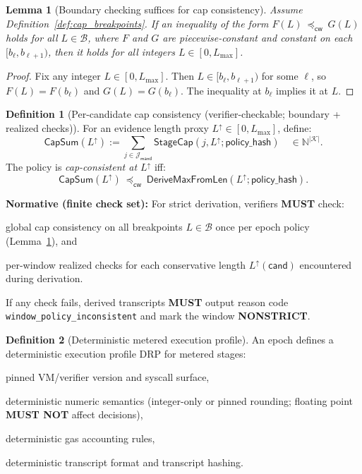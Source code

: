 \documentclass[11pt]{article}
\newcommand{\MUST}{\textbf{MUST}}
\newcommand{\MUSTNOT}{\textbf{MUST NOT}}
\newcommand{\code}[1]{\texttt{#1}}
\newcommand{\term}[1]{\emph{#1}}
\newcommand{\N}{\mathbb{N}}
\newcommand{\1}{\mathbf{1}}
\newcommand{\cwise}{\preceq_{\textsf{cw}}}
\theoremstyle{definition}
\newtheorem{definition}{Definition}
\theoremstyle{plain}
\newtheorem{lemma}{Lemma}
\begin{document}
\begin{lemma}[Boundary checking suffices for cap consistency]
\label{lem:cap_boundary_suffices}
Assume Definition~\ref{def:cap_breakpoints}. If an inequality of the form
$F(L)\ \cwise\ G(L)$
holds for all $L\in\mathcal{B}$, where $F$ and $G$ are piecewise-constant and constant on each $[b_\ell,b_{\ell+1})$, then it holds for all integers $L\in[0,L_{\max}]$.
\end{lemma}
\begin{proof}
Fix any integer $L\in[0,L_{\max}]$. Then $L\in[b_\ell,b_{\ell+1})$ for some $\ell$, so $F(L)=F(b_\ell)$ and $G(L)=G(b_\ell)$. The inequality at $b_\ell$ implies it at $L$.
\end{proof}

\begin{definition}[Per-candidate cap consistency (verifier-checkable; boundary + realized checks)]
\label{def:cap_consistency}
For an evidence length proxy $L^\uparrow\in[0,L_{\max}]$, define:
\[
\mathsf{CapSum}(L^\uparrow):=\sum_{j\in \mathcal{J}_{\textsf{mand}}} \mathsf{StageCap}(j,L^\uparrow;\textsf{policy\_hash})
\quad\in\N^{|\mathcal{K}|}.
\]
The policy is \term{cap-consistent at $L^\uparrow$} iff:
\[
\mathsf{CapSum}(L^\uparrow)\ \cwise\ \mathsf{DeriveMaxFromLen}(L^\uparrow;\textsf{policy\_hash}).
\]

\textbf{Normative (finite check set):}
For strict derivation, verifiers \MUST{} check:
\begin{tightitemize}
\item global cap consistency on all breakpoints $L\in\mathcal{B}$ once per epoch policy (Lemma~\ref{lem:cap_boundary_suffices}), and
\item per-window realized checks for each conservative length $L^\uparrow(\textsf{cand})$ encountered during derivation.
\end{tightitemize}
If any check fails, derived transcripts \MUST{} output reason code \code{window\_policy\_inconsistent} and mark the window \textbf{NONSTRICT}.
\end{definition}

\begin{definition}[Deterministic metered execution profile]
\label{def:drp}
An epoch defines a deterministic execution profile \textsf{DRP} for metered stages:
\begin{tightitemize}
\item pinned VM/verifier version and syscall surface,
\item deterministic numeric semantics (integer-only or pinned rounding; floating point \MUSTNOT{} affect decisions),
\item deterministic gas accounting rules,
\item deterministic transcript format and transcript hashing.
\end{tightitemize}
\end{definition}
\end{document}
